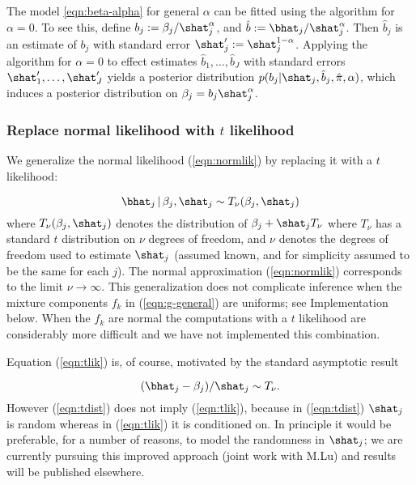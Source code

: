 The model \ref{eqn:beta-alpha} for general $\alpha$ can be fitted using the algorithm for $\alpha=0$. 
To see this, define $b_j:= \beta_j/ \shat_j^\alpha$, and $\hat{b} := \bhat_j/\shat_j^\alpha$. Then $\hat{b}_j$ is an estimate of $b_j$ with
 standard error $\shat'_j:=\shat_j^{1-\alpha}$. 
 Applying the algorithm for $\alpha=0$ to effect estimates $\hat{b}_1,\dots,\hat{b}_J$ with standard errors $\shat'_1,\dots,\shat'_J$
yields a posterior distribution $p(b_j | \shat_j, \hat{b}_j, \hat{\pi}, \alpha)$, which induces a posterior distribution on $\beta_j = b_j \shat_j^\alpha$.

\subsubsection*{Replace normal likelihood with $t$ likelihood}

We generalize the normal likelihood (\ref{eqn:normlik}) by replacing it with a $t$ likelihood:

\begin{equation}
\label{eqn:tlik}
 \bhat_j \, | \, \beta_j, \shat_j \sim T_\nu(\beta_j, \shat_j)
 \end{equation}
where $T_\nu(\beta_j,\shat_j)$ denotes the distribution of $\beta_j+\shat_j T_\nu$ where $T_\nu$ has a standard $t$ distribution on $\nu$ degrees of freedom,
and  $\nu$ denotes the degrees of freedom used to estimate $\shat_j$ (assumed known, and for simplicity assumed to be the same for each $j$).
The normal approximation (\ref{eqn:normlik}) corresponds to the limit $\nu \rightarrow \infty$.
This generalization does not complicate inference when the mixture components $f_k$ in (\ref{eqn:g-general}) are uniforms; see Implementation below.
When the $f_k$ are normal the computations with a $t$ likelihood are considerably more difficult and we have not implemented this combination.

Equation (\ref{eqn:tlik}) is, of course, motivated by the standard asymptotic result

\begin{equation}
\label{eqn:tdist}
(\bhat_j-\beta_j)/\shat_j \sim T_\nu.
\end{equation}
However (\ref{eqn:tdist}) does not imply (\ref{eqn:tlik}), because in (\ref{eqn:tdist}) $\shat_j$ is random whereas in (\ref{eqn:tlik}) it is conditioned on.
In principle it would be preferable, for a number of reasons, to model the randomness in $\shat_j$; we are
currently pursuing this improved approach (joint work with M.Lu) and results will be published elsewhere.

